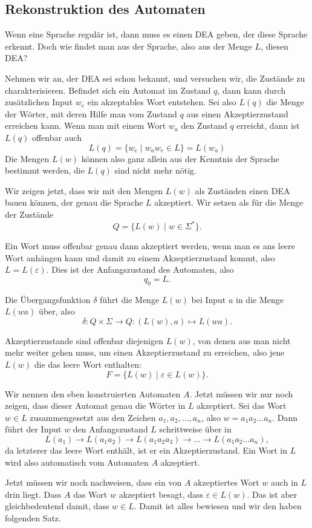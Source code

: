 \subsection{Rekonstruktion des Automaten\label{regulaer:rekonstruktion}}
Wenn eine Sprache regulär ist, dann muss es einen DEA geben, der
diese Sprache erkennt.
Doch wie findet man aus der Sprache, also aus der Menge $L$, diesen DEA?

Nehmen wir an, der DEA sei schon bekannt, und versuchen wir,
die Zustände zu charakterisieren.
Befindet sich ein Automat im Zustand $q$, dann kann durch zusätzlichen
Input $w_e$ ein akzeptables Wort entstehen.
Sei also $L(q)$ die Menge der Wörter, mit deren Hilfe man vom Zustand $q$
aus einen Akzeptierzustand erreichen kann.
Wenn man mit einem Wort $w_a$ den Zustand $q$ erreicht, dann ist $L(q)$
offenbar auch
\[
L(q)=\{ w_e\;|\; w_aw_e \in L\}= L(w_a)
\]
Die Mengen $L(w)$ können also ganz allein aus der Kenntnis der
Sprache bestimmt werden, die $L(q)$ sind nicht mehr nötig.

Wir zeigen jetzt, dass wir mit den Mengen $L(w)$ als Zuständen einen
DEA bauen können, der genau die Sprache $L$ akzeptiert.
Wir setzen als für die Menge der Zustände 
\[
Q=\{L(w)\;|\;w\in\Sigma^*\}.
\]

Ein Wort muss offenbar genau dann akzeptiert werden, wenn
man es ans leere Wort anhängen kann und damit zu einem Akzeptierzustand
kommt, also $L=L(\varepsilon)$.
Dies ist der Anfangszustand des Automaten, also
\[
q_0=L.
\]

Die Übergangsfunktion $\delta$ führt die Menge $L(w)$ bei Input
$a$ in die Menge $L(wa)$ über, also
\[
\delta \colon Q\times\Sigma\to Q:(L(w),a)\mapsto L(wa).
\]

Akzeptierzustande sind offenbar diejenigen $L(w)$, von denen
aus man nicht mehr weiter gehen muss, um einen Akzeptierzustand
zu erreichen, also jene $L(w)$ die das leere Wort enthalten:
\[
F=\{L(w)\;|\;\varepsilon\in L(w)\}.
\]

Wir nennen den eben konstruierten Automaten $A$.
Jetzt müssen wir nur noch zeigen, dass dieser Automat genau die
Wörter in $L$ akzeptiert.
Sei das Wort $w\in L$ zusammengesetzt aus den
Zeichen $a_1,a_2,\dots,a_n$, also $w=a_1a_2\dots a_n$.
Dann führt der Input $w$ den Anfangszustand $L$ schrittweise über in
\[
L(a_1)\to L(a_1a_2)\to L(a_1a_2a_3)\to \dots \to L(a_1a_2\dots a_n),
\]
da letzterer das leere Wort enthält, ist er ein Akzeptierzustand.
Ein Wort in $L$ wird also automatisch vom Automaten $A$ akzeptiert.

Jetzt müssen wir noch nachweisen, dass ein von $A$ akzeptiertes Wort $w$
auch in $L$ drin liegt.
Dass $A$ das Wort $w$ akzeptiert besagt, dass $\varepsilon \in L(w)$.
Das ist aber gleichbedeutend damit, dass $w\in L$.
Damit ist alles bewiesen und wir den haben folgenden Satz.

